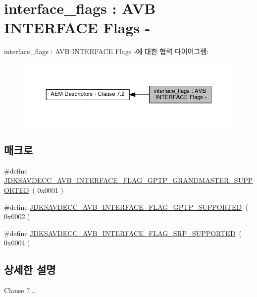 \hypertarget{group__avb__interface__flags}{}\section{interface\+\_\+flags \+: A\+VB I\+N\+T\+E\+R\+F\+A\+CE Flags -\/}
\label{group__avb__interface__flags}
interface\+\_\+flags \+: A\+VB I\+N\+T\+E\+R\+F\+A\+CE Flags -\/에 대한 협력 다이어그램\+:
\nopagebreak
\begin{figure}[H]
\begin{center}
\leavevmode
\includegraphics[width=350pt]{group__avb__interface__flags}
\end{center}
\end{figure}
\subsection*{매크로}
\begin{DoxyCompactItemize}
\item 
\#define \hyperlink{group__avb__interface__flags_gadf2e1349d5c1c46845a0aad2ed2c6749}{J\+D\+K\+S\+A\+V\+D\+E\+C\+C\+\_\+\+A\+V\+B\+\_\+\+I\+N\+T\+E\+R\+F\+A\+C\+E\+\_\+\+F\+L\+A\+G\+\_\+\+G\+P\+T\+P\+\_\+\+G\+R\+A\+N\+D\+M\+A\+S\+T\+E\+R\+\_\+\+S\+U\+P\+P\+O\+R\+T\+ED}~( 0x0001 )
\item 
\#define \hyperlink{group__avb__interface__flags_gadc2669c70c7cb15acdbb0f426dd7c626}{J\+D\+K\+S\+A\+V\+D\+E\+C\+C\+\_\+\+A\+V\+B\+\_\+\+I\+N\+T\+E\+R\+F\+A\+C\+E\+\_\+\+F\+L\+A\+G\+\_\+\+G\+P\+T\+P\+\_\+\+S\+U\+P\+P\+O\+R\+T\+ED}~( 0x0002 )
\item 
\#define \hyperlink{group__avb__interface__flags_ga93e1477788a2f951bf433df0793e19f0}{J\+D\+K\+S\+A\+V\+D\+E\+C\+C\+\_\+\+A\+V\+B\+\_\+\+I\+N\+T\+E\+R\+F\+A\+C\+E\+\_\+\+F\+L\+A\+G\+\_\+\+S\+R\+P\+\_\+\+S\+U\+P\+P\+O\+R\+T\+ED}~( 0x0004 )
\end{DoxyCompactItemize}


\subsection{상세한 설명}
Clause 7... 

